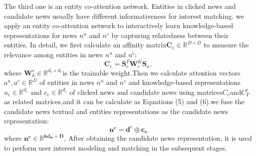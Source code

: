 \documentclass[withoutpreface,bwprint]{cumcmthesis} %
\begin{document}
	The third one is an entity co-attention network. Entities in
	clicked news and candidate news usually have different informativeness for interest matching. we apply an entity co-attention network to interactively learn knowledge-based representations for news $n^u$ and $n^c$ by capturing relatedness between their entities. In detail,
	we first calculate an affinity matrix$\mathbf{C}_e \in \mathbb{R}^{D \times D} $ to measure the relevance among entities in news $n^u$ and $n^c$:
	\begin{equation}
	\mathbf{C}_e = \mathbf{S}^T_c\mathbf{W}^K_c\mathbf{S}_u,
	\end{equation}
	where $\mathbf{W}^c_k \in \mathbb{R}^{d_e \times d_e}$is the trainable weight.Then we calculate attention vectors$a^u,a^c \in \mathbb{R}^{D}$ of entities in news $n^u$ and $n^c$ and knowledge-based representations 
	$u_e \in \mathbb{R}^{d_e}$ and $c_e \in \mathbb{R}^{d_e}$ of clicked news and candidate news using matrices$C_e$and$C^e_T$ as related matrices,and it can be calculate as Equations (5) and (6).we fuse the candidate news textual and entities representations as the candidate news representation:
	\begin{equation}
	\mathbf{n^c}=\mathbf{d}^c \oplus \mathbf{c_e}
	\end{equation}
	where $\mathbf{n^c \in \mathbb{R}^{kd_w+D}}$, After obtaining the candidate news representation, it is used to perform user interest modeling and matching in the subsequent stages.
\end{document}
